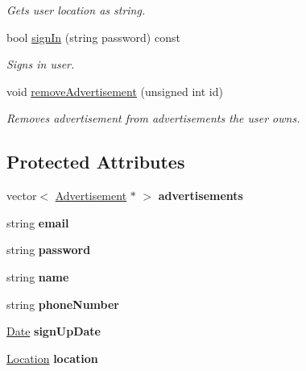 \begin{DoxyCompactItemize}
\begin{DoxyCompactList}\small\item\em Gets user location as string. \end{DoxyCompactList}\item 
bool \hyperlink{class_user_af75d18fdc45ac9fba9911815b78b7daa}{sign\+In} (string password) const 
\begin{DoxyCompactList}\small\item\em Signs in user. \end{DoxyCompactList}\item 
void \hyperlink{class_user_aa3bb1db20bfdae4ae26f8e5b84360f45}{remove\+Advertisement} (unsigned int id)
\begin{DoxyCompactList}\small\item\em Removes advertisement from advertisements the user owns. \end{DoxyCompactList}\end{DoxyCompactItemize}
\subsection*{Protected Attributes}
\begin{DoxyCompactItemize}
\item 
\hypertarget{class_user_a9a78e0f9ab50c5d9d3041d1d90acd4d8}{}vector$<$ \hyperlink{class_advertisement}{Advertisement} $\ast$ $>$ {\bfseries advertisements}\label{class_user_a9a78e0f9ab50c5d9d3041d1d90acd4d8}

\item 
\hypertarget{class_user_a2d678acd22b533660b4b7d8404961f14}{}string {\bfseries email}\label{class_user_a2d678acd22b533660b4b7d8404961f14}

\item 
\hypertarget{class_user_ab537b9a55bc7d7fcafcdf8e53d085e67}{}string {\bfseries password}\label{class_user_ab537b9a55bc7d7fcafcdf8e53d085e67}

\item 
\hypertarget{class_user_a643f85779a4693855c171c396f49e515}{}string {\bfseries name}\label{class_user_a643f85779a4693855c171c396f49e515}

\item 
\hypertarget{class_user_a727ba647fe019be6fa9c03308d60da9e}{}string {\bfseries phone\+Number}\label{class_user_a727ba647fe019be6fa9c03308d60da9e}

\item 
\hypertarget{class_user_ab508f13f113618c508641e7f47932cc9}{}\hyperlink{class_date}{Date} {\bfseries sign\+Up\+Date}\label{class_user_ab508f13f113618c508641e7f47932cc9}

\item 
\hypertarget{class_user_a1c8e68a346c8a47d8cf0e75356c66562}{}\hyperlink{class_location}{Location} {\bfseries location}\label{class_user_a1c8e68a346c8a47d8cf0e75356c66562}

\end{DoxyCompactItemize}
